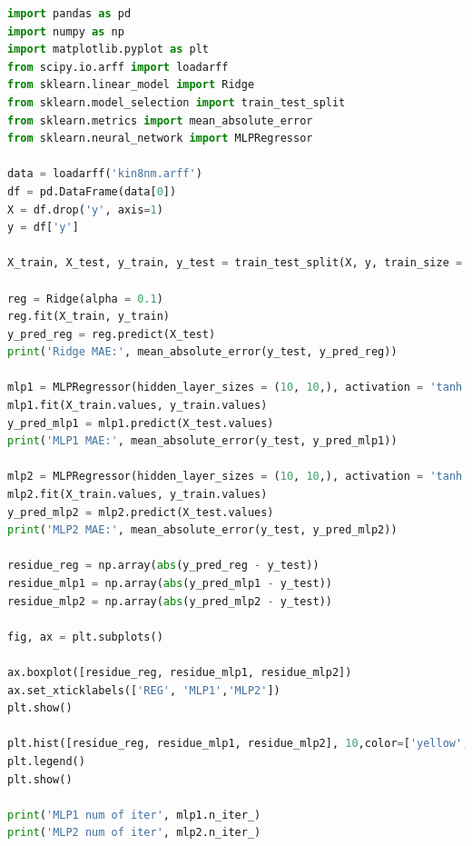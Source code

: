 \documentclass[12pt]{article}
\begin{document}
\begin{lstlisting}[language=Python]
import pandas as pd
import numpy as np
import matplotlib.pyplot as plt
from scipy.io.arff import loadarff
from sklearn.linear_model import Ridge
from sklearn.model_selection import train_test_split
from sklearn.metrics import mean_absolute_error
from sklearn.neural_network import MLPRegressor

data = loadarff('kin8nm.arff')
df = pd.DataFrame(data[0])
X = df.drop('y', axis=1)
y = df['y']

X_train, X_test, y_train, y_test = train_test_split(X, y, train_size = 0.7, random_state = 0)

reg = Ridge(alpha = 0.1)
reg.fit(X_train, y_train)
y_pred_reg = reg.predict(X_test)
print('Ridge MAE:', mean_absolute_error(y_test, y_pred_reg))

mlp1 = MLPRegressor(hidden_layer_sizes = (10, 10,), activation = 'tanh', max_iter = 500, random_state = 0, early_stopping = True)
mlp1.fit(X_train.values, y_train.values)
y_pred_mlp1 = mlp1.predict(X_test.values)
print('MLP1 MAE:', mean_absolute_error(y_test, y_pred_mlp1))

mlp2 = MLPRegressor(hidden_layer_sizes = (10, 10,), activation = 'tanh', max_iter = 500, random_state = 0, early_stopping = False)
mlp2.fit(X_train.values, y_train.values)
y_pred_mlp2 = mlp2.predict(X_test.values)
print('MLP2 MAE:', mean_absolute_error(y_test, y_pred_mlp2))

residue_reg = np.array(abs(y_pred_reg - y_test))
residue_mlp1 = np.array(abs(y_pred_mlp1 - y_test))
residue_mlp2 = np.array(abs(y_pred_mlp2 - y_test))

fig, ax = plt.subplots()

ax.boxplot([residue_reg, residue_mlp1, residue_mlp2])
ax.set_xticklabels(['REG', 'MLP1','MLP2'])
plt.show()

plt.hist([residue_reg, residue_mlp1, residue_mlp2], 10,color=['yellow', 'orange', 'red'], label=['REG', 'MLP1', 'MLP2'])
plt.legend()
plt.show()

print('MLP1 num of iter', mlp1.n_iter_)
print('MLP2 num of iter', mlp2.n_iter_)
\end{lstlisting}
\end{document}
